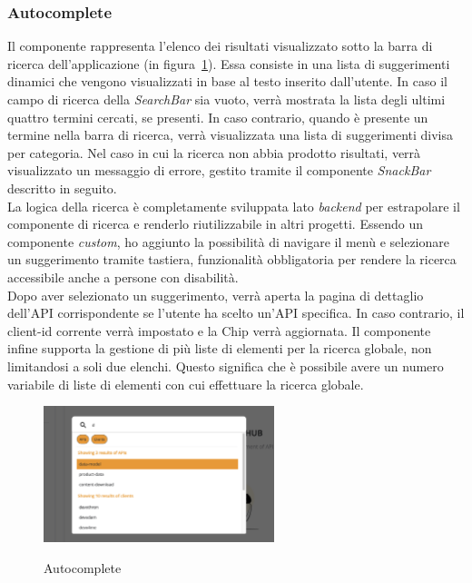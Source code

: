 \subsubsection{Autocomplete}\label{subsubsec:autocomplete}
Il componente rappresenta l'elenco dei risultati visualizzato sotto la barra di ricerca dell'applicazione (in figura~\ref{fig:autocomplete}).
Essa consiste in una lista di suggerimenti dinamici che vengono visualizzati in base al testo inserito dall'utente. 
In caso il campo di ricerca della \textit{SearchBar} sia vuoto, verrà mostrata la lista degli ultimi quattro termini cercati, se presenti.
In caso contrario, quando è presente un termine nella barra di ricerca, verrà visualizzata una lista di suggerimenti divisa per categoria.
Nel caso in cui la ricerca non abbia prodotto risultati, verrà visualizzato un messaggio di errore, gestito tramite il componente \textit{SnackBar} descritto in seguito.\\
La logica della ricerca è completamente sviluppata lato \textit{backend} per estrapolare il componente di ricerca e renderlo riutilizzabile in altri progetti.
Essendo un componente \textit{custom}, ho aggiunto la possibilità di navigare il menù e selezionare un suggerimento tramite tastiera, funzionalità 
obbligatoria per rendere la ricerca accessibile anche a persone con disabilità.\\
Dopo aver selezionato un suggerimento, verrà aperta la pagina di dettaglio dell'API corrispondente se l'utente ha scelto un'API specifica.  In caso contrario, il client-id corrente verrà impostato e la Chip verrà aggiornata.
Il componente infine supporta la gestione di più liste di elementi per la ricerca globale, non limitandosi a soli due elenchi. Questo significa che è possibile avere un numero variabile di liste di elementi con cui effettuare la ricerca globale. 

\begin{figure}[ht]
  \centering
  \includegraphics[width=0.6\textwidth, alt={Componente che si occupa della lista dinamica di risultati}]{images/frontend/SearchBar2.jpg}
  \caption{Autocomplete}\label{fig:autocomplete}
\end{figure}
\pagebreak
